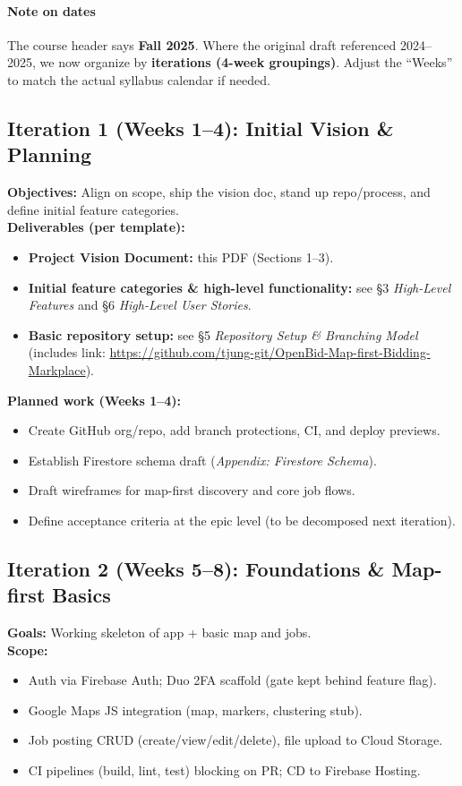 \documentclass[11pt]{article}
\newcommand{\repoURL}{https://github.com/tjung-git/OpenBid-Map-first-Bidding-Markplace}
\begin{document}
\paragraph{Note on dates}
The course header says \textbf{Fall 2025}. Where the original draft referenced 2024--2025, we now organize by \textbf{iterations (4-week groupings)}. Adjust the “Weeks” to match the actual syllabus calendar if needed.

\subsection*{Iteration 1 (Weeks 1--4): Initial Vision \& Planning}
\textbf{Objectives:} Align on scope, ship the vision doc, stand up repo/process, and define initial feature categories. \\
\textbf{Deliverables (per template):}
\begin{itemize}[leftmargin=1.4em]
  \item \textbf{Project Vision Document:} this PDF (Sections 1--3).
  \item \textbf{Initial feature categories \& high-level functionality:} see \S3 \emph{High-Level Features} and \S6 \emph{High-Level User Stories}.
  \item \textbf{Basic repository setup:} see \S5 \emph{Repository Setup \& Branching Model} (includes link: \href{\repoURL}{\repoURL}).
\end{itemize}
\textbf{Planned work (Weeks 1--4):}
\begin{itemize}[leftmargin=1.4em]
  \item Create GitHub org/repo, add branch protections, CI, and deploy previews.
  \item Establish Firestore schema draft (\emph{Appendix: Firestore Schema}).
  \item Draft wireframes for map-first discovery and core job flows.
  \item Define acceptance criteria at the epic level (to be decomposed next iteration).
\end{itemize}

\subsection*{Iteration 2 (Weeks 5--8): Foundations \& Map-first Basics}
\textbf{Goals:} Working skeleton of app + basic map and jobs. \\
\textbf{Scope:}
\begin{itemize}[leftmargin=1.4em]
  \item Auth via Firebase Auth; Duo 2FA scaffold (gate kept behind feature flag).
  \item Google Maps JS integration (map, markers, clustering stub).
  \item Job posting CRUD (create/view/edit/delete), file upload to Cloud Storage.
  \item CI pipelines (build, lint, test) blocking on PR; CD to Firebase Hosting.
\end{itemize}
\end{document}
